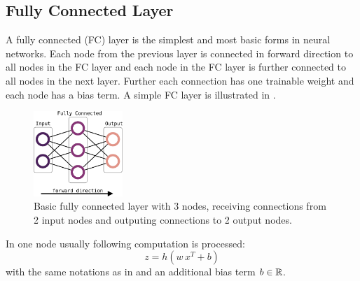 \subsection{Fully Connected Layer}
A fully connected (FC) layer is the simplest and most basic forms in neural networks.
Each node from the previous layer is connected in forward direction to all nodes in the FC layer and each node in the FC layer is further connected to all nodes in the next layer.
Further each connection has one trainable weight and each node has a bias term.
A simple FC layer is illustrated in .
\begin{figure}[!ht]
  \centering
    \includegraphics[width=0.30\textwidth]{./4_nn/figs/nn_theory_fc.eps}
  \caption{Basic fully connected layer with 3 nodes, receiving connections from 2 input nodes and outputing connections to 2 output nodes.}
  \label{fig:nn_theory_fc}
\end{figure}
\FloatBarrier
\noindent
In one node usually following computation is processed:
\begin{equation}
  z = h(w \, x^T + b)
\end{equation}
with the same notations as in  and an additional bias term $b \in \mathbb{R}$.



